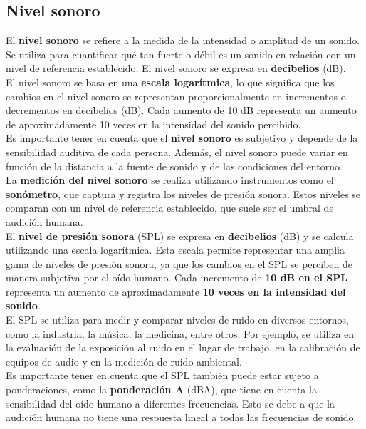 \documentclass[
	12pt, %
	fleqn, %
	a4paper, %
	oneside, %
]{LegrandOrangeBook}
\begin{document}
\subsection{Nivel sonoro}
El \textbf{nivel sonoro} se refiere a la medida de la intensidad o amplitud de un sonido. Se utiliza para cuantificar qué tan fuerte o débil es un sonido en relación con un nivel de referencia establecido. El nivel sonoro se expresa en \textbf{decibelios} (dB).\\
El nivel sonoro se basa en una \textbf{escala logarítmica}, lo que significa que los cambios en el nivel sonoro se representan proporcionalmente en incrementos o decrementos en decibelios (dB). Cada aumento de 10 dB representa un aumento de aproximadamente 10 veces en la intensidad del sonido percibido.\\
Es importante tener en cuenta que el \textbf{nivel sonoro} es subjetivo y depende de la sensibilidad auditiva de cada persona. Además, el nivel sonoro puede variar en función de la distancia a la fuente de sonido y de las condiciones del entorno.\\
La \textbf{medición del nivel sonoro} se realiza utilizando instrumentos como el \textbf{sonómetro}, que captura y registra los niveles de presión sonora. Estos niveles se comparan con un nivel de referencia establecido, que suele ser el umbral de audición humana.\\
El \textbf{nivel de presión sonora} (SPL) se expresa en \textbf{decibelios} (dB) y se calcula utilizando una escala logarítmica. Esta escala permite representar una amplia gama de niveles de presión sonora, ya que los cambios en el SPL se perciben de manera subjetiva por el oído humano. Cada incremento de \textbf{10 dB en el SPL} representa un aumento de aproximadamente \textbf{10 veces en la intensidad del sonido}.\\
El SPL se utiliza para medir y comparar niveles de ruido en diversos entornos, como la industria, la música, la medicina, entre otros. Por ejemplo, se utiliza en la evaluación de la exposición al ruido en el lugar de trabajo, en la calibración de equipos de audio y en la medición de ruido ambiental.\\
Es importante tener en cuenta que el SPL también puede estar sujeto a ponderaciones, como la \textbf{ponderación A} (dBA), que tiene en cuenta la sensibilidad del oído humano a diferentes frecuencias. Esto se debe a que la audición humana no tiene una respuesta lineal a todas las frecuencias de sonido.
\end{document}
